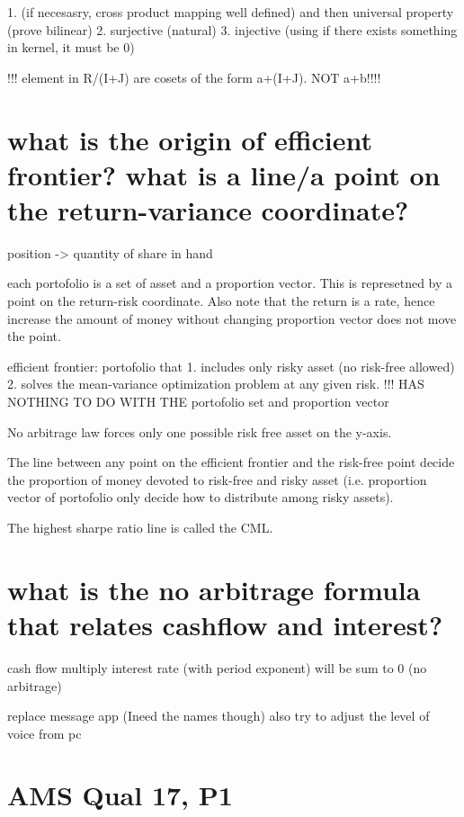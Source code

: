 {{{{{{{	1. (if necesasry, cross product mapping well defined) and then universal property (prove bilinear)
	2. surjective (natural)
	3. injective (using if there exists something in kernel, it must be 0)



!!! element in R/(I+J) are cosets of the form a+(I+J). NOT a+b!!!!





\section*{what is the origin of efficient frontier? what is a line/a point on the return-variance coordinate?}

position -> quantity of share in hand

each portofolio is a set of asset and a proportion vector. This is represetned by a point on the return-risk coordinate. Also note that the return is a rate, hence increase the amount of money without changing proportion vector does not move the point.

efficient frontier: portofolio that 
	1. includes only risky asset (no risk-free allowed)
	2. solves the mean-variance optimization problem at any given risk.
!!! HAS NOTHING TO DO WITH THE portofolio set and proportion vector

No arbitrage law forces only one possible risk free asset on the y-axis.

The line between any point on the efficient frontier and the risk-free point decide the proportion of money devoted to risk-free and risky asset (i.e. proportion vector of portofolio only decide how to distribute among risky assets).

The highest sharpe ratio line is called the CML.



\section*{what is the no arbitrage formula that relates cashflow and interest?}
cash flow multiply interest rate (with period exponent) will be sum to 0 (no arbitrage)


replace message app (Ineed the names though)
also try to adjust the level of voice from pc


\section*{AMS Qual 17, P1}

}}}}}}}
